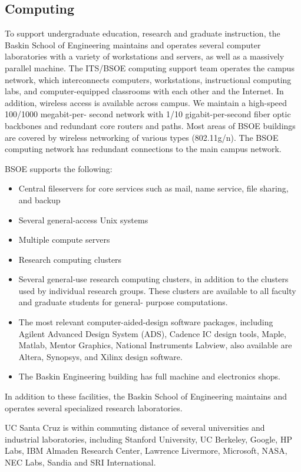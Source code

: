 \subsection{Computing} To support undergraduate education, research and graduate instruction, the Baskin School of Engineering maintains and operates several computer laboratories with a variety of workstations and servers, as well as a massively parallel machine. The ITS/BSOE computing support team operates the campus network, which interconnects computers, workstations, instructional computing labs, and computer-equipped classrooms with each other and the Internet. In addition, wireless access is available across campus. We maintain a high-speed 100/1000 megabit-per- second network with 1/10 gigabit-per-second fiber optic backbones and redundant core routers and paths. Most areas of BSOE buildings are covered by wireless networking of various types (802.11g/n). The BSOE computing network has redundant connections to the main campus network.

BSOE supports the following:
\begin{itemize}
    \item Central fileservers for core services such as mail, name service, file sharing, and backup
    \item Several general-access Unix systems
    \item Multiple compute servers
    \item Research computing clusters
    \item Several general-use research computing clusters, in addition to the clusters used by individual
research groups. These clusters are available to all faculty and graduate students for general-
purpose computations.
    \item The most relevant computer-aided-design software packages, including Agilent Advanced
Design System (ADS), Cadence IC design tools, Maple, Matlab, Mentor Graphics, National
Instruments Labview, also available are Altera, Synopsys, and Xilinx design software.
    \item The Baskin Engineering building has full machine and electronics shops.
\end{itemize}

In addition to these facilities, the Baskin School of Engineering maintains and operates several
specialized research laboratories.

UC Santa Cruz is within commuting distance of several universities and industrial laboratories,
including Stanford University, UC Berkeley, Google, HP Labs, IBM Almaden Research Center,
Lawrence Livermore, Microsoft, NASA, NEC Labs, Sandia and SRI International.
